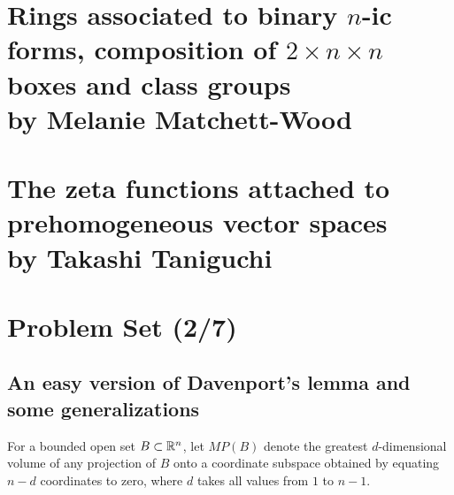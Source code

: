 \documentclass[12pt,amsfont]{amsart}
\begin{document}
\section{Rings associated to binary $n$-ic forms, composition of $2 \times n \times n$ boxes and class groups\\ by Melanie Matchett-Wood}\label{3}

\newpage
\renewcommand{\thesubsection}{\arabic{section}.\arabic{subsection}}
\section{The zeta functions attached to prehomogeneous vector spaces
\\ by Takashi Taniguchi}\label{14}

\newpage
\renewcommand{\thesubsection}{\arabic{section}.\arabic{subsection}}
\section{Problem Set (2/7)}\label{15}
\subsection{
\textbf{An easy version of Davenport's lemma and some generalizations}}


For a bounded open set $B\subset {\mathbb R}^n$, let $MP(B)$ denote the
greatest $d$-dimensional volume of any projection of $B$ onto a
coordinate subspace obtained by equating $n-d$ coordinates to zero,
where $d$ takes all values from $1$ to $n-1$.
\end{document}

